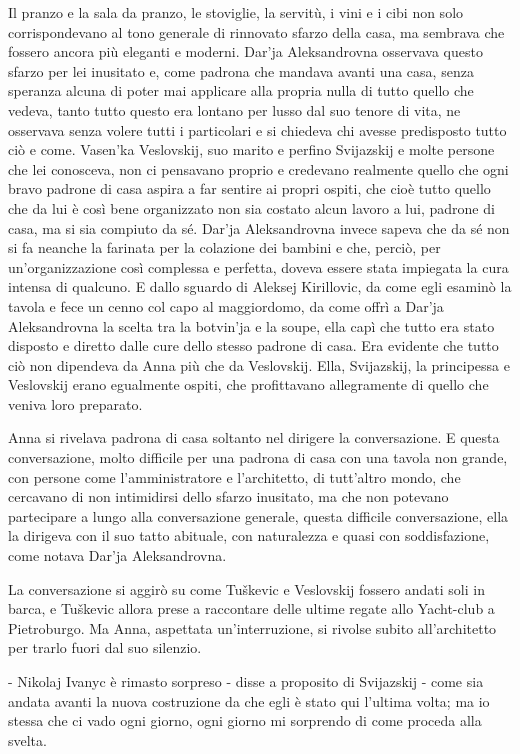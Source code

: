Il pranzo e la sala da pranzo, le stoviglie, la servitù, i vini e i cibi non solo corrispondevano al tono generale di rinnovato sfarzo della casa, ma sembrava che fossero ancora più eleganti e moderni. Dar'ja Aleksandrovna osservava questo sfarzo per lei inusitato e, come padrona che mandava avanti una casa, senza speranza alcuna di poter mai applicare alla propria nulla di tutto quello che vedeva, tanto tutto questo era lontano per lusso dal suo tenore di vita, ne osservava senza volere tutti i particolari e si chiedeva chi avesse predisposto tutto ciò e come. Vasen'ka Veslovskij, suo marito e perfino Svijazskij e molte persone che lei conosceva, non ci pensavano proprio e credevano realmente quello che ogni bravo padrone di casa aspira a far sentire ai propri ospiti, che cioè tutto quello che da lui è così bene organizzato non sia costato alcun lavoro a lui, padrone di casa, ma si sia compiuto da sé. Dar'ja Aleksandrovna invece sapeva che da sé non si fa neanche la farinata per la colazione dei bambini e che, perciò, per un'organizzazione così complessa e perfetta, doveva essere stata impiegata la cura intensa di qualcuno. E dallo sguardo di Aleksej Kirillovic, da come egli esaminò la tavola e fece un cenno col capo al maggiordomo, da come offrì a Dar'ja Aleksandrovna la scelta tra la botvin'ja e la soupe, ella capì che tutto era stato disposto e diretto dalle cure dello stesso padrone di casa. Era evidente che tutto ciò non dipendeva da Anna più che da Veslovskij. Ella, Svijazskij, la principessa e Veslovskij erano egualmente ospiti, che profittavano allegramente di quello che veniva loro preparato. 

Anna si rivelava padrona di casa soltanto nel dirigere la conversazione. E questa conversazione, molto difficile per una padrona di casa con una tavola non grande, con persone come l'amministratore e l'architetto, di tutt'altro mondo, che cercavano di non intimidirsi dello sfarzo inusitato, ma che non potevano partecipare a lungo alla conversazione generale, questa difficile conversazione, ella la dirigeva con il suo tatto abituale, con naturalezza e quasi con soddisfazione, come notava Dar'ja Aleksandrovna. 

La conversazione si aggirò su come Tuškevic e Veslovskij fossero andati soli in barca, e Tuškevic allora prese a raccontare delle ultime regate allo Yacht-club a Pietroburgo. Ma Anna, aspettata un'interruzione, si rivolse subito all'architetto per trarlo fuori dal suo silenzio. 

- Nikolaj Ivanyc è rimasto sorpreso - disse a proposito di Svijazskij - come sia andata avanti la nuova costruzione da che egli è stato qui l'ultima volta; ma io stessa che ci vado ogni giorno, ogni giorno mi sorprendo di come proceda alla svelta. 

